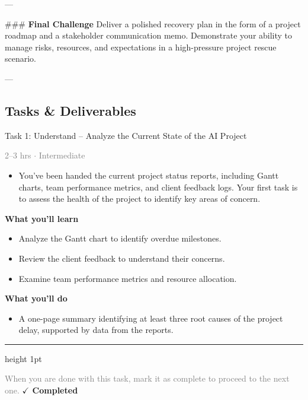 \documentclass[10pt,a4paper]{article}
\begin{document}
---

\#\#\# \textbf{Final Challenge}
Deliver a polished recovery plan in the form of a project roadmap and a stakeholder communication memo. Demonstrate your ability to manage risks, resources, and expectations in a high-pressure project rescue scenario.

---

\subsection*{Tasks \& Deliverables}

\begin{taskbox}{Task 1: Understand – Analyze the Current State of the AI Project}

    {\small \textcolor{gray}{2--3 hrs $\cdot$ Intermediate}}\\[12pt]

\begin{itemize}
    \item You’ve been handed the current project status reports, including Gantt charts, team performance metrics, and client feedback logs. Your first task is to assess the health of the project to identify key areas of concern.

\end{itemize}
\vspace{8pt}
{\large \textbf{\textcolor{brandLight}{What you'll learn}}}\\[4pt] 
\begin{itemize}
    \item Analyze the Gantt chart to identify overdue milestones.
    \item Review the client feedback to understand their concerns.
    \item Examine team performance metrics and resource allocation.

\end{itemize}
{\large \textbf{\textcolor{brandLight}{What you'll do}}}\\[4pt] 
\begin{itemize}
    \item A one-page summary identifying at least three root causes of the project delay, supported by data from the reports.\par
\end{itemize}

    \vspace{16pt}

    \textcolor{cardBorder}{\hrule height 1pt}\vspace{8pt}

    \small \textcolor{gray}{When you are done with this task, mark it as complete to proceed to the next one.} \hfill \textbf{\textcolor{brandDark}{$\checkmark$ Completed}}

\end{taskbox}
\end{document}
